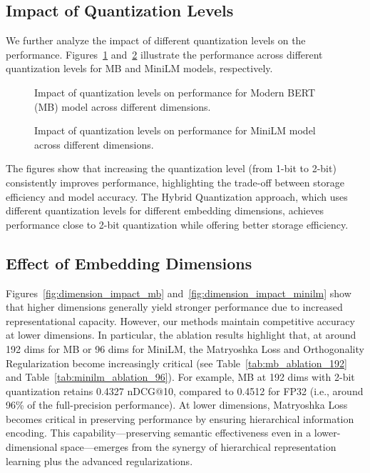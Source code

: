 \subsection{Impact of Quantization Levels}
\label{sec:quantization_levels}

We further analyze the impact of different quantization levels on the performance. 
Figures~\ref{fig:quantization_impact_mb} and~\ref{fig:quantization_impact_minilm} illustrate the performance across different quantization levels for MB and MiniLM models, respectively.

\begin{figure}[ht]
    \centering
    \caption{Impact of quantization levels on performance for Modern BERT (MB) model across different dimensions.}
    \label{fig:quantization_impact_mb}
\end{figure}

\begin{figure}[ht]
    \centering
    \caption{Impact of quantization levels on performance for MiniLM model across different dimensions.}
    \label{fig:quantization_impact_minilm}
\end{figure}

The figures show that increasing the quantization level (from 1-bit to 2-bit) consistently improves performance, highlighting the trade-off between storage efficiency and model accuracy. The Hybrid Quantization approach, which uses different quantization levels for different embedding dimensions, achieves performance close to 2-bit quantization while offering better storage efficiency.

\subsection{Effect of Embedding Dimensions}
\label{sec:dimension_effect}

Figures~\ref{fig:dimension_impact_mb} and~\ref{fig:dimension_impact_minilm} show that higher dimensions generally yield stronger performance due to increased representational capacity. However, our methods maintain competitive accuracy at lower dimensions.
In particular, the ablation results highlight that, at around 192 dims for MB or 96 dims for MiniLM, the Matryoshka Loss and Orthogonality Regularization become increasingly critical (see Table~\ref{tab:mb_ablation_192} and Table~\ref{tab:minilm_ablation_96}). 
For example, MB at 192 dims with 2-bit quantization retains 0.4327 nDCG@10, compared to 0.4512 for FP32 (i.e., around 96\% of the full-precision performance). 
At lower dimensions, Matryoshka Loss becomes critical in preserving performance by ensuring hierarchical information encoding.
This capability—preserving semantic effectiveness even in a lower-dimensional space—emerges from the synergy of hierarchical representation learning plus the advanced regularizations.


